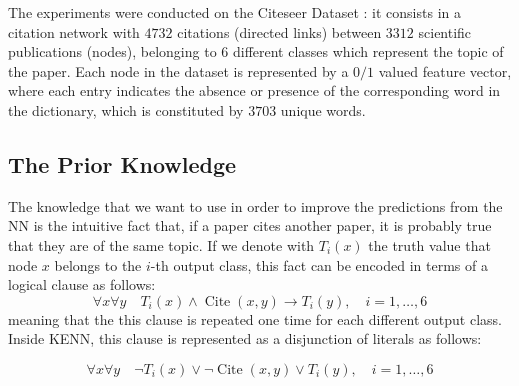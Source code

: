 The experiments were conducted on the Citeseer Dataset \cite{lu2003link}: it consists in a citation network with $4732$ citations (directed links) between $3312$ scientific publications (nodes), belonging to $6$ different classes which represent the topic of the paper. Each node in the dataset is represented by a $0/1$ valued feature vector, where each entry indicates the absence or presence of the corresponding word in the dictionary, which is constituted by $3703$ unique words.

\subsection{The Prior Knowledge}

The knowledge that we want to use in order to improve the predictions from the NN is the intuitive fact that, if a paper cites another paper, it is probably true that they are of the same topic. If we denote with $T_i(x)$ the truth value that node $x$ belongs to the $i$-th output class, this fact can be encoded in terms of a logical clause as follows:
$$\forall x \forall y \quad T_i(x) \wedge \operatorname{Cite}(x, y) \rightarrow T_i(y), \quad i=1,\dots,6$$
meaning that the this clause is repeated one time for each different output class. Inside KENN, this clause is represented as a disjunction of literals as follows:

$$\forall x \forall y \quad \neg T_i(x) \vee \neg \operatorname{Cite}(x,y) \vee T_i(y), \quad i=1,\dots,6 $$

